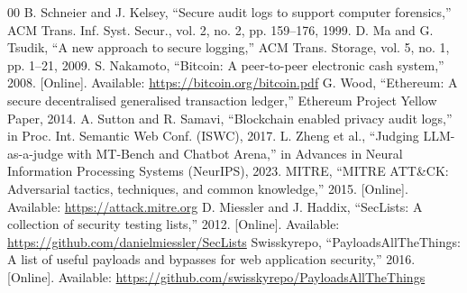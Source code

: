 \documentclass[conference]{IEEEtran}
\begin{document}
\begin{thebibliography}{00}
 B. Schneier and J. Kelsey, ``Secure audit logs to support computer forensics,'' ACM Trans. Inf. Syst. Secur., vol. 2, no. 2, pp. 159--176, 1999.
 D. Ma and G. Tsudik, ``A new approach to secure logging,'' ACM Trans. Storage, vol. 5, no. 1, pp. 1--21, 2009.
 S. Nakamoto, ``Bitcoin: A peer-to-peer electronic cash system,'' 2008. [Online]. Available: \url{https://bitcoin.org/bitcoin.pdf}
 G. Wood, ``Ethereum: A secure decentralised generalised transaction ledger,'' Ethereum Project Yellow Paper, 2014.
 A. Sutton and R. Samavi, ``Blockchain enabled privacy audit logs,'' in Proc. Int. Semantic Web Conf. (ISWC), 2017.
 L. Zheng et al., ``Judging LLM-as-a-judge with MT-Bench and Chatbot Arena,'' in Advances in Neural Information Processing Systems (NeurIPS), 2023.
 MITRE, ``MITRE ATT\&CK: Adversarial tactics, techniques, and common knowledge,'' 2015. [Online]. Available: \url{https://attack.mitre.org}
 D. Miessler and J. Haddix, ``SecLists: A collection of security testing lists,'' 2012. [Online]. Available: \url{https://github.com/danielmiessler/SecLists}
 Swisskyrepo, ``PayloadsAllTheThings: A list of useful payloads and bypasses for web application security,'' 2016. [Online]. Available: \url{https://github.com/swisskyrepo/PayloadsAllTheThings}
\end{thebibliography}
\end{document}
